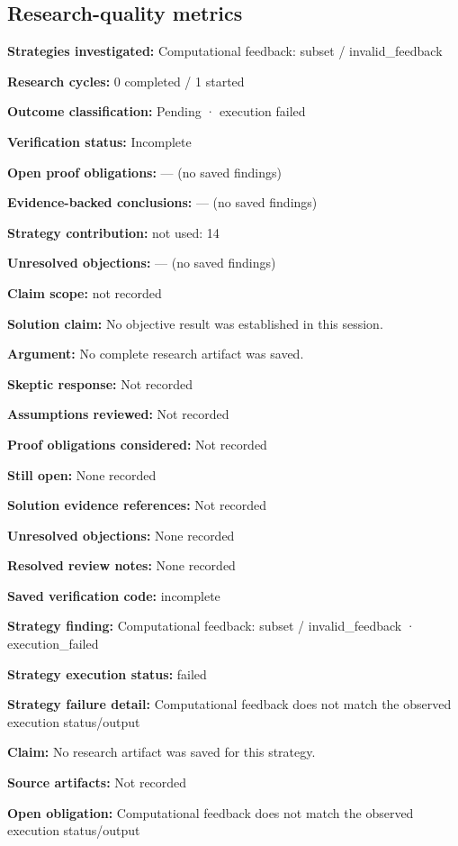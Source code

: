 \documentclass[11pt]{article}
\begin{document}
\subsection{Research-quality metrics}
\textbf{Strategies investigated:} Computational feedback: subset / invalid\_feedback\par
\textbf{Research cycles:} 0 completed / 1 started\par
\textbf{Outcome classification:} Pending · execution failed\par
\textbf{Verification status:} Incomplete\par
\textbf{Open proof obligations:} — (no saved findings)\par
\textbf{Evidence-backed conclusions:} — (no saved findings)\par
\textbf{Strategy contribution:} not used: 14\par
\textbf{Unresolved objections:} — (no saved findings)\par
\textbf{Claim scope:} not recorded\par
\textbf{Solution claim:} No objective result was established in this session.\par
\textbf{Argument:} No complete research artifact was saved.\par
\textbf{Skeptic response:} Not recorded\par
\textbf{Assumptions reviewed:} Not recorded\par
\textbf{Proof obligations considered:} Not recorded\par
\textbf{Still open:} None recorded\par
\textbf{Solution evidence references:} Not recorded\par
\textbf{Unresolved objections:} None recorded\par
\textbf{Resolved review notes:} None recorded\par
\textbf{Saved verification code:} incomplete\par
\textbf{Strategy finding:} Computational feedback: subset / invalid\_feedback · execution\_failed\par
\textbf{Strategy execution status:} failed\par
\textbf{Strategy failure detail:} Computational feedback does not match the observed execution status/output\par
\textbf{Claim:} No research artifact was saved for this strategy.\par
\textbf{Source artifacts:} Not recorded\par
\textbf{Open obligation:} Computational feedback does not match the observed execution status/output\par
\end{document}
